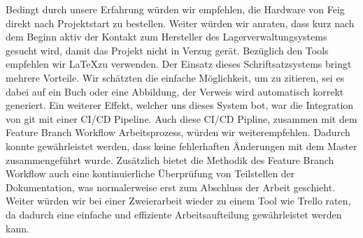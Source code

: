 Bedingt durch unsere Erfahrung würden wir empfehlen, die Hardware von Feig direkt nach Projektstart zu bestellen. Weiter würden wir anraten, dass kurz nach dem Beginn aktiv der Kontakt zum Hersteller des Lagerverwaltungsystems gesucht wird, damit das Projekt nicht in Verzug gerät. Bezüglich den Tools empfehlen wir \LaTeX zu verwenden. Der Einsatz dieses Schriftsatzsystems bringt mehrere Vorteile. Wir schätzten die einfache Möglichkeit, um zu zitieren, sei es dabei auf ein Buch oder eine Abbildung, der Verweis wird automatisch korrekt generiert. Ein weiterer Effekt, welcher uns dieses System bot, war die Integration von git mit einer CI/CD Pipeline. Auch diese CI/CD Pipline, zusammen mit dem Feature Branch Workflow Arbeitsprozess, würden wir weiterempfehlen. Dadurch konnte gewährleistet werden, dass keine fehlerhaften Änderungen mit dem Master zusammengeführt wurde. Zusätzlich bietet die Methodik des Feature Branch Workflow auch eine kontinuierliche Überprüfung von Teilstellen der Dokumentation, was normalerweise erst zum Abschluss der Arbeit geschieht. Weiter würden wir bei einer Zweierarbeit wieder zu einem Tool wie Trello raten, da dadurch eine einfache und effiziente Arbeitsaufteilung gewährleistet werden kann.